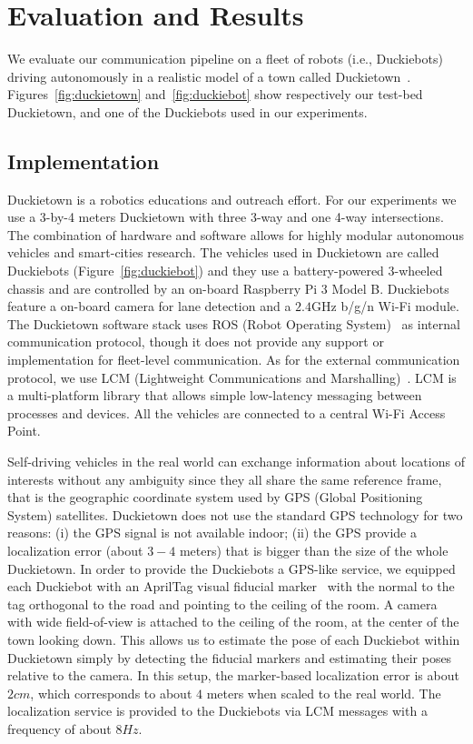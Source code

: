 \section{Evaluation and Results}

We evaluate our communication pipeline on a fleet of robots (i.e., Duckiebots) driving autonomously in a 
realistic model of a town called Duckietown~\cite{paull2017duckietown}. Figures~\ref{fig:duckietown} 
and~\ref{fig:duckiebot} show respectively our test-bed Duckietown, and one of the Duckiebots used in our 
experiments.

\subsection{Implementation}
Duckietown is a robotics educations and outreach effort. For our experiments we use a 3-by-4 meters Duckietown
with three 3-way and one 4-way intersections. 
The combination of hardware and software allows for highly modular autonomous vehicles and smart-cities research. 
The vehicles used in Duckietown are called Duckiebots (Figure~\ref{fig:duckiebot}) and they use a battery-powered 3-wheeled 
chassis and are controlled by an on-board Raspberry Pi 3 Model B. Duckiebots feature a on-board camera for lane detection and 
a $2.4$GHz b/g/n Wi-Fi module. The Duckietown software stack uses ROS (Robot Operating System)~\cite{quigley2009ros} 
as internal communication protocol, though it does not provide any support or implementation for fleet-level communication.
As for the external communication protocol, we use LCM (Lightweight Communications and Marshalling)~\citep{huang2010lcm}.
LCM is a multi-platform library that allows simple low-latency messaging between processes and devices. All the vehicles are 
connected to a central Wi-Fi Access Point.


Self-driving vehicles in the real world can exchange information about locations of interests without any ambiguity since
they all share the same reference frame, that is the geographic coordinate system used by GPS (Global Positioning System) satellites.
Duckietown does not use the standard GPS technology for two reasons: (i) the GPS signal is not available indoor; (ii) the GPS provide
a localization error (about $3-4$ meters) that is bigger than the size of the whole Duckietown.
In order to provide the Duckiebots a GPS-like service, we equipped each Duckiebot with an AprilTag visual fiducial 
marker~\cite{olson2011tags} with the normal to the tag orthogonal to the road and pointing to the ceiling of the room.
A camera with wide field-of-view is attached to the ceiling of the room, at the center of the town looking down. This allows
us to estimate the pose of each Duckiebot within Duckietown simply by detecting the fiducial markers and estimating their
poses relative to the camera.
In this setup, the marker-based localization error is about $2cm$, which corresponds to about $4$ meters when scaled to the real world.
The localization service is provided to the Duckiebots via LCM messages with a frequency of about $8Hz$.


